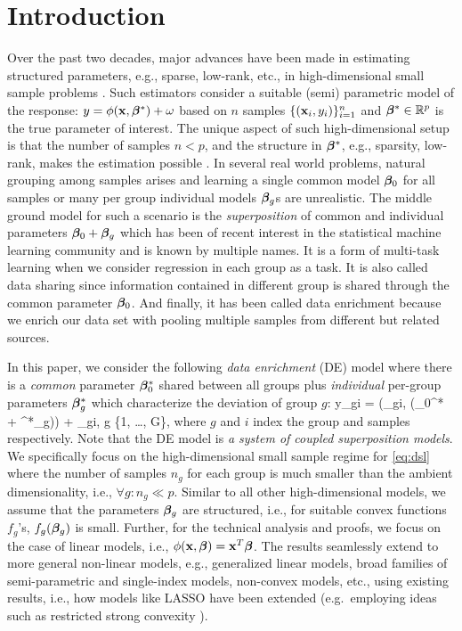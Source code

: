 \section{Introduction}
Over the past two decades, major advances have been made in estimating structured parameters, e.g., sparse, low-rank, etc., in high-dimensional small sample problems \cite{donoho2006compressed,candes2010power,friedman2008sparse}. Such estimators consider a suitable (semi) parametric model of the response: $y = \phi(\mathbf{x},\boldsymbol{\beta}^*) + \omega$ based on $n$ samples $\{(\mathbf{x}_i,y_i)\}_{i=1}^n$ and $\boldsymbol{\beta}^* \in \mathbb R^p$ is the true parameter of interest. The unique aspect of such high-dimensional setup is that the number of samples $n < p$, and the structure in $\boldsymbol{\beta}^*$, e.g., sparsity, low-rank, makes the estimation possible \cite{tibshirani1996regression,candes2006robust,candes2009exact}. In several real world problems, natural grouping among samples arises and learning a single common model $\boldsymbol{\beta}_0$ for all samples or many per group individual models $\boldsymbol{\beta}_g$s are unrealistic. The middle ground model for such a scenario is the \emph{superposition} of common and individual parameters $\boldsymbol{\beta}_0 + \boldsymbol{\beta}_g$ which has been of recent interest in the statistical machine learning community \cite{guba16} and is known by multiple names. It is a form of multi-task learning \cite{Zhang2017-rm, jrsr10} when we consider regression in each group as a task. It is also called data sharing \cite{grti16} since information contained in different group is shared through the common parameter $\boldsymbol{\beta}_0$. And finally, it has been called data enrichment \cite{Chen2015-fj, Asiaee2018-eg} because we enrich our data set with pooling multiple samples from different but related sources.

In this paper, we consider the following \emph{data enrichment} (DE) model where there is a \emph{common} parameter $\boldsymbol{\beta}^*_0$ shared between all groups plus \emph{individual} per-group parameters $\boldsymbol{\beta}_g^*$ which characterize the deviation of group $g$:
\be
\label{eq:dsl}
y_{gi} = \phi(\x_{gi}, (\bbeta_0^* + \bbeta^*_g)) + \omega_{gi}, \quad g \in \{1, \dots, G\},
\ee
where $g$ and $i$ index the group and samples respectively. %
Note that the DE model is \emph{a system of coupled superposition models}.
We specifically focus on the high-dimensional small sample regime for \eqref{eq:dsl} where the number of samples $n_g$ for each group is much smaller than the ambient dimensionality, i.e., $\forall g: n_g \ll p$. Similar to all other high-dimensional models, we assume that the parameters $\boldsymbol{\beta}_g$ are structured, i.e., for suitable convex functions $f_g$'s, $f_g(\boldsymbol{\beta}_g)$ is small. Further, for the technical analysis and proofs,
we focus on the case of linear models, i.e., $\phi(\mathbf{x},\boldsymbol{\beta}) = \mathbf{x}^T \boldsymbol{\beta}$. The results seamlessly extend to more general non-linear models, e.g., generalized linear models, broad families of semi-parametric and single-index models, non-convex models, etc., using existing results, i.e., how models like LASSO have been extended (e.g.~employing ideas such as restricted strong convexity \cite{negahban2012restricted}). 


